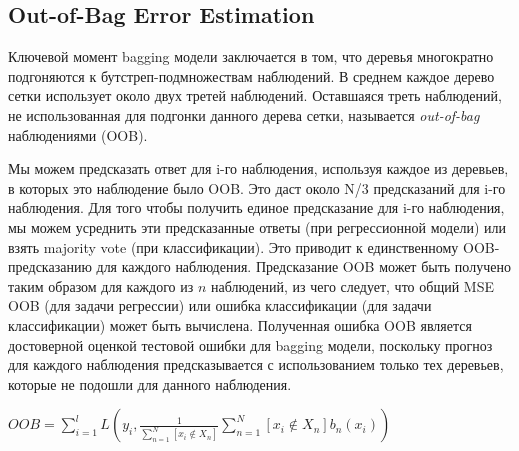 \documentclass{article}
\theoremstyle{definition}
\theoremstyle{theorem}
\theoremstyle{remark}
\theoremstyle{theorem}
\theoremstyle{example}
\theoremstyle{theorem}
\theoremstyle{theorem}
\theoremstyle{theorem}
\theoremstyle{theorem}
\begin{document}
\subsection{Out-of-Bag Error Estimation}

Ключевой момент bagging модели заключается в том, что деревья многократно подгоняются к бутстреп-подмножествам наблюдений. В среднем каждое дерево сетки использует около двух третей наблюдений. Оставшаяся треть наблюдений, не использованная для подгонки данного дерева сетки, называется \textit{out-of-bag} наблюдениями (OOB).

Мы можем предсказать ответ для i-го наблюдения, используя каждое из деревьев, в которых это наблюдение было OOB. Это даст около N/3 предсказаний для i-го наблюдения. Для того чтобы получить единое предсказание для i-го  наблюдения, мы можем усреднить эти предсказанные ответы (при регрессионной модели) или взять majority vote (при классификации). Это приводит к единственному OOB-предсказанию для каждого наблюдения. Предсказание OOB может быть получено таким образом для каждого из $n$ наблюдений, из чего следует, что общий MSE OOB (для задачи регрессии) или ошибка классификации (для задачи классификации) может быть вычислена. Полученная ошибка OOB является достоверной оценкой тестовой ошибки для bagging модели, поскольку прогноз для каждого наблюдения предсказывается с использованием только тех деревьев, которые не подошли для данного наблюдения. 

$OOB = \sum_{i=1}^{l}L\left(y_i,\frac{1}{\sum_{n=1}^{N}\left[x_i \notin X_n\right]}\sum_{n=1}^{N}[x_i\notin X_n]b_n(x_i)\right)$
\end{document}

